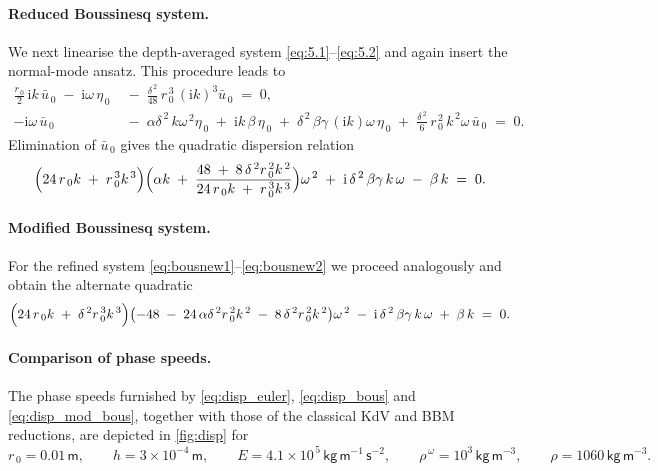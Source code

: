 \documentclass[alpha-refs, 12pt]{wiley-article}
\newcommand{\ui}{\mathrm{i}}
\begin{document}
\paragraph{Reduced Boussinesq system.} We next linearise the depth-averaged system \eqref{eq:5.1}--\eqref{eq:5.2} and again insert the normal-mode ansatz.  This procedure leads to
\begin{align}
  \frac{r_{\,0}}{2}\,\ui k\,\bar{u}_{\,0}\;-\;\ui\omega\,\eta_{\,0}
  &\;-\;\frac{\delta^{\,2}}{48}\,r_{\,0}^{\,3}\,(\ui k)^{3}\bar{u}_{\,0}
  \;=\;0, \label{eq:lin_red1}\\
  -\ui\omega\,\bar{u}_{\,0}
  &\;-\;\alpha\delta^{\,2}\,k\omega^{\,2}\eta_{\,0}
  \;+\;\ui k\,\beta\,\eta_{\,0}
  \;+\;\delta^{\,2}\,\beta\gamma\,(\ui k)\omega\,\eta_{\,0}
  \;+\;\frac{\delta^{\,2}}{6}\,r_{\,0}^{\,2}\,k^{\,2}\omega\,\bar{u}_{\,0}
  \;=\;0. \label{eq:lin_red2}
\end{align}
Elimination of $\bar{u}_{\,0}$ gives the quadratic dispersion relation
\begin{equation}\label{eq:disp_bous}
  \Bigl(24\,r_{\,0}k\;+\;r_{\,0}^{\,3}k^{\,3}\Bigr)\Bigl(\alpha k\;+\;
  \frac{48\;+\;8\,\delta^{\,2}r_{\,0}^{\,2}k^{\,2}}{24\,r_{\,0}k\;+\;r_{\,0}^{\,3}k^{\,3}}\Bigr)\omega^{\,2}
  \;+\;\ui\,\delta^{\,2}\,\beta\gamma\,k\,\omega\;-\;\beta\,k\;=\;0.
\end{equation}

\paragraph{Modified Boussinesq system.} For the refined system \eqref{eq:bousnew1}--\eqref{eq:bousnew2} we proceed analogously and obtain the alternate quadratic
\begin{equation}\label{eq:disp_mod_bous}
  \Bigl(24\,r_{\,0}k\;+\;\delta^{\,2}r_{\,0}^{\,3}k^{\,3}\Bigr)
  \bigl(-48\;-\;24\,\alpha\delta^{\,2}r_{\,0}^{\,2}k^{\,2}\;
  -\;8\,\delta^{\,2}r_{\,0}^{\,2}k^{\,2}\bigr)\omega^{\,2}
  \;-\;\ui\,\delta^{\,2}\,\beta\gamma\,k\,\omega
  \;+\;\beta\,k\;=\;0.
\end{equation}

\paragraph{Comparison of phase speeds.} The phase speeds furnished by \eqref{eq:disp_euler}, \eqref{eq:disp_bous} and \eqref{eq:disp_mod_bous}, together with those of the classical KdV and BBM reductions, are depicted in \cref{fig:disp} for
\[
  r_{\,0}=0.01\,\mathsf{m}, \qquad
  h=3\times10^{-4}\,\mathsf{m}, \qquad
  E=4.1\times10^{\,5}\,\mathsf{kg}\,\mathsf{m}^{-1}\,\mathsf{s}^{-2}, \qquad
  \rho^{\,\omega}=10^{3}\,\mathsf{kg}\,\mathsf{m}^{-3}, \qquad
  \rho=1060\,\mathsf{kg}\,\mathsf{m}^{-3}.
\]
\end{document}
